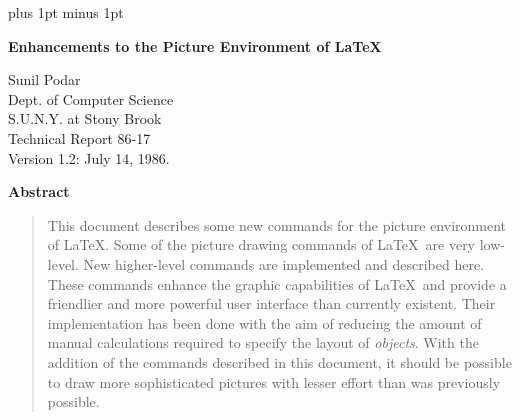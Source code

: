 \setlength{\unitlength}{1mm}
\parskip=6pt plus 1pt minus 1pt
\itemsep=0pt
\renewcommand{\baselinestretch}{1.3}
\newcommand{\bs}{\char '134 }  %
\newcommand{\lb}{\char '173 }  %
\newcommand{\rb}{\char '175 }  %
\newcommand{\plotchar}{\makebox(0,0){\large $\otimes$}}
\pagestyle{plain}

\thispagestyle{empty}
\begin{center}
{\Large\bf Enhancements to the Picture Environment of \LaTeX}
\end{center}

\vspace*{0.5in}
\begin{center}
\begin{it}
Sunil Podar\\
Dept. of Computer Science\\
S.U.N.Y. at Stony Brook\\
Technical Report 86-17\\[3mm]
Version 1.2: July 14, 1986.
\end{it}
\end{center}

\vspace*{1.3in}
\begin{center}
{\bf Abstract}
\end{center}

{\renewcommand{\baselinestretch}{1.5} \small\normalsize
\begin{quote}
This document describes some new commands for the picture environment of
\LaTeX. Some of the picture drawing commands of
\LaTeX\ are very low-level. New higher-level commands are implemented and
described here. These commands enhance the graphic capabilities of
\LaTeX\ and provide a friendlier and more powerful user
interface than currently existent. Their implementation has been done
with the aim of reducing the amount of
manual calculations required to specify the layout of {\it objects}.
With the addition of the commands described in this document, it should be
possible to draw
more sophisticated pictures with lesser effort than was previously possible.
\end{quote}
}

